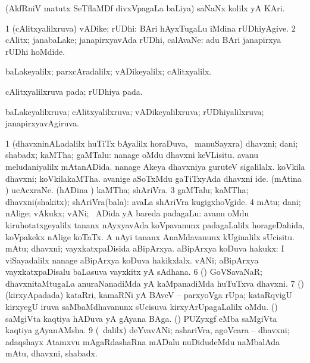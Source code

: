 \bentry
{} 
\gl{\nA}
\expl{}
\bmng
 (AkfRniV matutx SeTflaMDf divxVpagaLa baLiya) saNaNx kolilx yA KAri. 
\emng
\eentry

\bentry 
{} 
\gl{\nA}
\expl{}
\bmng
\bnum
\num{1} (cAlitxyalilxruva) vADike; rUDhi:  BAri hAyxTugaLu iMdina rUDhiyAgive. 
\num{2} cAlitx; janabaLake; janapirxyavAda rUDhi, calAvaNe:  adu BAri janapirxya rUDhi hoMdide. 
\enum
\emng

\noindent 
\gl{\pagu}
\expl{}
\bmng
  baLakeyalilx; parxcAradalilx; vADikeyalilx; cAlitxyalilx. 
\emng
\eentry

\bentry 
{} 
\gl{\nA}
\expl{}
\bmng
 cAlitxyalilxruva pada; rUDhiya pada. 
\emng
\eentry

\bentry 
{} 
\gl{\gu}
\expl{}
\bmng
 baLakeyalilxruva; cAlitxyalilxruva; vADikeyalilxruva; rUDhiyalilxruva; janapirxyavAgiruva. 
\emng
\eentry

\bentry 
{} 
\gl{\nA}
\expl{}
\bmng
\bnum
\num{1} (dhavxninALadalilx huTiTx bAyalilx horaDuva, \kanmu\ manuSayxra) dhavxni; dani; shabadx; kaMTha; gaMTalu:  nanage oMdu dhavxni keVLisitu.  avanu meludaniyalilx mAtanADida.  nanage Akeya dhavxniya guruteV sigalilalx.  koVkila dhavxni; koVkilakaMTha.  avanige aSoTxMdu gaTiTxyAda dhavxni ide. 
\banum
{} (mAtina \vi) ucAcxraNe. 
 (hADina \vi) kaMTha; shAriVra. 
\eanum
\numie
\num{3} gaMTalu; kaMTha; dhavxni(shakitx); shAriVra(bala):  avaLa shAriVra kugigxhoVgide. 
\num{4} mAtu; dani; nAlige; vAkukx; vANi; \kanmu\ ADida yA bareda padagaLu:  avanu oMdu kiruhotatxgeyalilx tananx nAyxyavAda koVpavanunx padagaLalilx horageDahida, koVpakekx nAlige koTaTx.  A nAyi tananx AnaMdavanunx kUginalilx sUcisitu. 
\banum
{} mAtu; dhavxni; vayxkatxpaDisida aBipArxya. 
 aBipArxya koDuva hakukx:  I viSayadalilx nanage aBipArxya koDuva hakikxlalx. 
 vANi; aBipArxya vayxkatxpaDisalu baLasuva vayxkitx yA sAdhana. 
\eanum
\numie
\num{6} (\dhavxni) GoVSavaNaR; dhavxnitaMtugaLa anuraNanadiMda yA kaMpanadiMda huTuTxva dhavxni. 
\num{7} (\vAyx) (kirxyApadada) kataRri, kamaRNi yA BAveV -- parxyoVga rUpa; kataRqvigU kirxyegU iruva saMbaMdhavanunx sUcisuva kirxyArUpagaLalilx oMdu. 
\banum
{} (\saM) saMgiVta kaqtiya hADuva yA gAyana BAga. 
 (\saM) PUZyxgf eMba saMgiVta kaqtiya gAyanAMsha. 
\eanum
\numie
\num{9} (\sA\ \bava dalilx) deYvavANi; ashariVra, agoVcara -- dhavxni; adaqshayx Atamxvu mAgaRdashaRna mADalu nuDidudeMdu naMbalAda mAtu, dhavxni, shabadx. 
\enum
\emng


